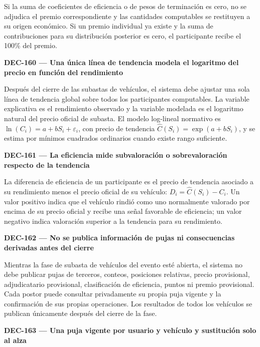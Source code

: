 \documentclass[10pt,letterpaper]{article}
\begin{document}
Si la suma de coeficientes de eficiencia o de pesos de terminación es cero, no se adjudica el premio correspondiente y las cantidades computables se restituyen a su origen económico. Si un premio individual ya existe y la suma de contribuciones para su distribución posterior es cero, el participante recibe el 100\% del premio.\par
\noindent\textbf{DEC-160 --- Una única línea de tendencia modela el logaritmo del precio en función del rendimiento}\par
Después del cierre de las subastas de vehículos, el sistema debe ajustar una sola línea de tendencia global sobre todos los participantes computables. La variable explicativa es el rendimiento observado y la variable modelada es el logaritmo natural del precio oficial de subasta. El modelo log-lineal normativo es $\ln(C_i)=a+bS_i+\varepsilon_i$, con precio de tendencia $\widehat C(S_i)=\exp(a+bS_i)$, y se estima por mínimos cuadrados ordinarios cuando existe rango suficiente.\par\vspace{0.45em}
\noindent\textbf{DEC-161 --- La eficiencia mide subvaloración o sobrevaloración respecto de la tendencia}\par
La diferencia de eficiencia de un participante es el precio de tendencia asociado a su rendimiento menos el precio oficial de su vehículo: $D_i=\widehat C(S_i)-C_i$. Un valor positivo indica que el vehículo rindió como uno normalmente valorado por encima de su precio oficial y recibe una señal favorable de eficiencia; un valor negativo indica valoración superior a la tendencia para su rendimiento.\par\vspace{0.45em}
\noindent\textbf{DEC-162 --- No se publica información de pujas ni consecuencias derivadas antes del cierre}\par
Mientras la fase de subasta de vehículos del evento esté abierta, el sistema no debe publicar pujas de terceros, conteos, posiciones relativas, precio provisional, adjudicatario provisional, clasificación de eficiencia, puntos ni premio provisional. Cada postor puede consultar privadamente su propia puja vigente y la confirmación de sus propias operaciones. Los resultados de todos los vehículos se publican únicamente después del cierre de la fase.\par\vspace{0.45em}
\noindent\textbf{DEC-163 --- Una puja vigente por usuario y vehículo y sustitución solo al alza}\par
\end{document}
